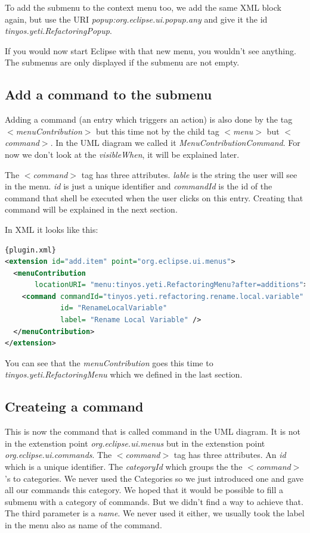 \documentclass[a4paper,10pt]{report}
\begin{document}
To add the submenu to the context menu too, we add the same XML block again, but use the URI {\it popup:org.eclipse.ui.popup.any} and give it the id {\it tinyos.yeti.RefactoringPopup}.

If you would now start Eclipse with that new menu, you wouldn't see anything. The submenus are only displayed if the submenu are not empty.
\subsection{Add a command to the submenu}
Adding a command (an entry which triggers an action) is also done by the tag {\it $<$menuContribution$>$} but this time not by the child tag {\it $<$menu$>$} but {\it $<$command$>$}.
In the UML diagram we called it {\it MenuContributionCommand}. For now we don't look at the {\it visibleWhen}, it will be explained later.

The {\it $<$command$>$} tag has three attributes. {\it lable} is the string the user will see in the menu. {\it id} is just a unique identifier and {\it commandId} is the 
id of the command that shell be executed when the user clicks on this entry. Creating that command will be explained in the next section.

In XML it looks like this:
\begin{lstlisting}[language=XML,caption=Adding a command to a menu ({\it plugin.xml})]{plugin.xml}
<extension id="add.item" point="org.eclipse.ui.menus">
  <menuContribution
       locationURI= "menu:tinyos.yeti.RefactoringMenu?after=additions">
    <command commandId="tinyos.yeti.refactoring.rename.local.variable"
             id= "RenameLocalVariable"
             label= "Rename Local Variable" />
  </menuContribution>
</extension>
\end{lstlisting}
You can see that the {\it menuContribution} goes this time to {\it tinyos.yeti.RefactoringMenu} which we defined in the last section.

\subsection{Createing a command}
This is now the command that is called command in the UML diagram. It is not in the extenstion point {\it org.eclipse.ui.menus} but in the extenstion point {\it org.eclipse.ui.commands}. 
The {\it $<$command$>$} tag has three attributes. An {\it id} which is a unique identifier. The {\it categoryId} which groups the the {\it $<$command$>$}'s to categories.
We never used the Categories so we just introduced one and gave all our commands this category. We hoped that it would be possible to fill a submenu with a category of commands.
But we didn't find a way to achieve that. The third parameter is a {\it name}. We never used it either, we usually took the label in the menu also as name of the command.
\end{document}
